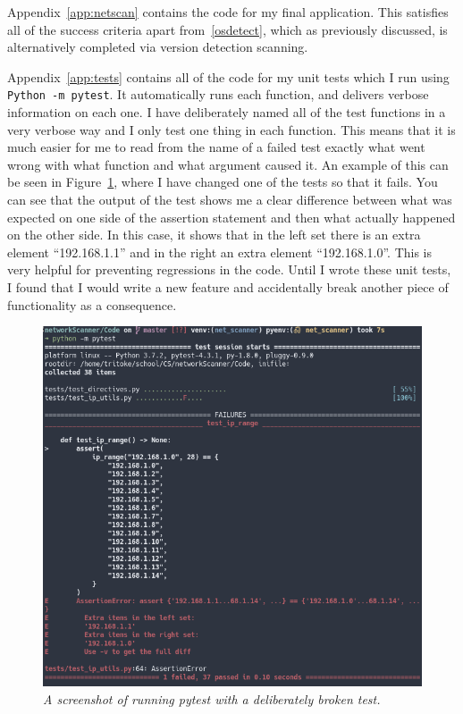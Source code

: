 \documentclass[titlepage]{article}
\begin{document}
Appendix~\ref{app:netscan} contains the code for my final application.
This satisfies all of the success criteria apart from~\ref{osdetect},
which as previously discussed, is alternatively completed via version detection scanning.

Appendix~\ref{app:tests} contains all of the code for my unit tests which I run using \\
\verb|Python -m pytest|.
It automatically runs each function, and delivers verbose information on each one.
I have deliberately named all of the test functions in a very verbose way and I only test one thing in each function.
This means that it is much easier for me to read from the name of a failed test exactly what went wrong
with what function and what argument caused it.
An example of this can be seen in Figure~\ref{testing},
where I have changed one of the tests so that it fails.
You can see that the output of the test shows me a clear difference between what
was expected on one side of the assertion statement
and then what actually happened on the other side.
In this case,
it shows that in the left set there is an extra element ``192.168.1.1''
and in the right an extra element ``192.168.1.0''.
This is very helpful for preventing regressions in the code.
Until I wrote these unit tests,
I found that I would write a new feature and accidentally break
another piece of functionality as a consequence.

\begin{figure}[H]
  \centering
  \includegraphics[width=\textwidth]{testing.png}
  \caption{\textit{%
    A screenshot of running pytest with a deliberately broken test.
}}\label{testing}
\end{figure}
\end{document}
